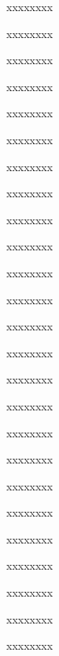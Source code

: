 \begin{inparaenum}
  \pb{} xxxx\pa{}xxxx%

  \pb{} xxxx\pa{}xxxx%

  \pb{} xxxx\pa{}xxxx%

  \pb{} xxxx\pa{}xxxx%

  \pb{} xxxx\pa{}xxxx%

  \pb{} xxxx\pa{}xxxx%

  \pb{} xxxx\pa{}xxxx%

  \pb{} xxxx\pa{}xxxx%

  \pb{} xxxx\pa{}xxxx%

  \pb{} xxxx\pa{}xxxx%

  \pb{} xxxx\pa{}xxxx%

  \pb{} xxxx\pa{}xxxx%

  \pb{} xxxx\pa{}xxxx%

  \pb{} xxxx\pa{}xxxx%

  \pb{} xxxx\pa{}xxxx%

  \pb{} xxxx\pa{}xxxx%

  \pb{} xxxx\pa{}xxxx%

  \pb{} xxxx\pa{}xxxx%

  \pb{} xxxx\pa{}xxxx%

  \pb{} xxxx\pa{}xxxx%

  \pb{} xxxx\pa{}xxxx%

  \pb{} xxxx\pa{}xxxx%

  \pb{} xxxx\pa{}xxxx%

  \pb{} xxxx\pa{}xxxx%

  \pb{} xxxx\pa{}xxxx%
\end{inparaenum}
